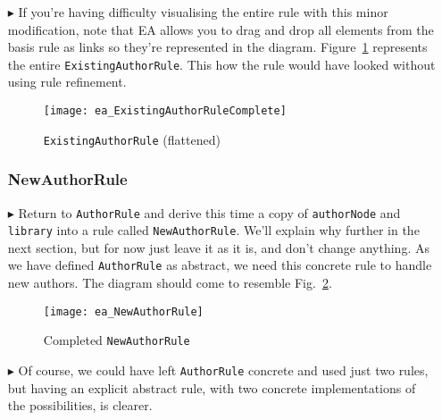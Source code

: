 \begin{itemize}
\item[$\blacktriangleright$] If you're having difficulty visualising the entire rule with this minor modification, note that EA allows you to drag and drop all
elements from the basis rule as links so they're represented in the diagram. Figure~\ref{ea:existingAuthorRuleComplete} represents the entire
\texttt{ExistingAuthorRule}. This how the rule would have looked without using rule refinement.

\vspace{0.5cm}

\begin{figure}[htbp]
\begin{center}
  \texttt{[image: ea\_ExistingAuthorRuleComplete]}
  \caption{\texttt{ExistingAuthorRule} (flattened)}
  \label{ea:existingAuthorRuleComplete}
\end{center}
\end{figure}

\vspace{-0.5cm}

\subsubsection{NewAuthorRule} %

\item[$\blacktriangleright$] Return to \texttt{AuthorRule} and derive this time a copy of \texttt{authorNode} and \texttt{library} into a rule called
\texttt{NewAuthorRule}. We'll explain why further in the next section, but for now just leave it as it is, and don't change anything. As we have defined
\texttt{AuthorRule} as abstract, we need this concrete rule to handle new authors. The diagram should come to resemble Fig.~\ref{ea:NewAuthorRule}.

\vspace{0.5cm}

\begin{figure}[htbp]
\begin{center}
  \texttt{[image: ea\_NewAuthorRule]}
  \caption{Completed \texttt{NewAuthorRule}}
  \label{ea:NewAuthorRule}
\end{center}
\end{figure}

\item[$\blacktriangleright$] Of course, we could have left \texttt{AuthorRule} concrete and used just two rules, but having an explicit abstract rule, with
two concrete implementations of the possibilities, is clearer.


\end{itemize}
